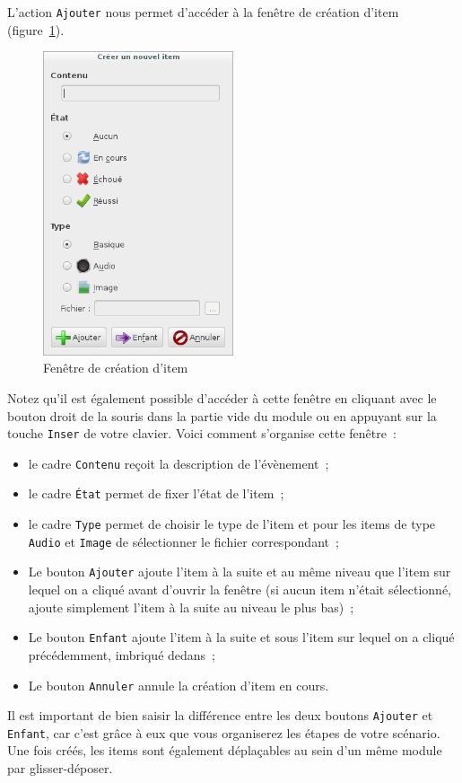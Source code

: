 \documentclass[a4paper,12pt]{article}
\newcommand*{\interfaceitem}[1]{\texttt{#1}}
\newcommand*{\guillemets}[1]{\og #1\fg{}\xspace}
\begin{document}
L'action \interfaceitem{Ajouter} nous permet d'accéder à la fenêtre de création d'item (figure~\ref{fig:ajout}).
\begin{figure}[ht]
    \centerline{\includegraphics[width=0.5\textwidth]{add_item}}
    \caption{Fenêtre de création d'item}
    \label{fig:ajout}
\end{figure}
Notez qu'il est également possible d'accéder à cette fenêtre en cliquant avec le bouton droit de la souris dans la partie vide du module ou en appuyant sur la touche \interfaceitem{Inser} de votre clavier.
Voici comment s'organise cette fenêtre~:
\begin{itemize}
    \item le cadre \interfaceitem{Contenu} reçoit la description de l'évènement~;
    \item le cadre \interfaceitem{État} permet de fixer l'état de l'item~;
    \item le cadre \interfaceitem{Type} permet de choisir le type de l'item et pour les items de type \interfaceitem{Audio} et \interfaceitem{Image} de sélectionner le fichier correspondant~;
    \item Le bouton \interfaceitem{Ajouter} ajoute l'item à la suite et au même niveau que l'item sur lequel on a cliqué avant d'ouvrir la fenêtre (si aucun item n'était sélectionné, ajoute simplement l'item à la suite au niveau le plus bas)~;
    \item Le bouton \interfaceitem{Enfant} ajoute l'item à la suite et sous l'item sur lequel on a cliqué précédemment, imbriqué dedans~;
    \item Le bouton \interfaceitem{Annuler} annule la création d'item en cours.
\end{itemize}
Il est important de bien saisir la différence entre les deux boutons \interfaceitem{Ajouter} et \interfaceitem{Enfant}, car c'est grâce à eux que vous organiserez les étapes de votre scénario.
Une fois créés, les items sont également déplaçables au sein d'un même module par \guillemets{glisser-déposer}.
\end{document}
